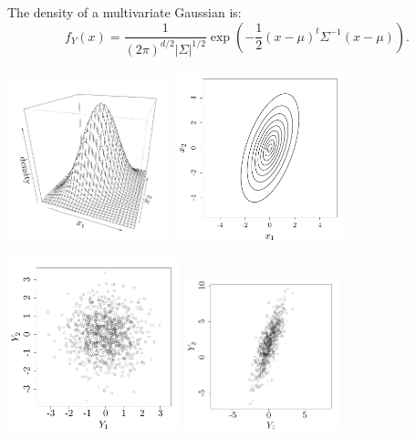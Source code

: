 \documentclass{beamer}
\begin{document}
\begin{frame}{}
The density of a multivariate Gaussian is:
\begin{equation*}
f_Y(x) = \frac{1}{\displaystyle (2 \pi)^{d/2} |\Sigma|^{1/2}} \exp \left(-\frac12 (x-\mu)^t \Sigma^{-1} (x-\mu)  \right).
\end{equation*} 
\begin{center}
 \includegraphics[height=4.7cm]{figures/R/MVN_dens2} \qquad \includegraphics[height=5cm]{figures/R/ch1_pdf2} 
\end{center}
\end{frame}


\begin{frame}{}
\begin{example}
\begin{center}
 \includegraphics[height=5cm]{figures/R/MVN_gaussvec2} \quad \includegraphics[height=4.5cm]{figures/R/MVN_gaussvec1} 
\end{center}
\end{example}
\end{frame}
\end{document}
